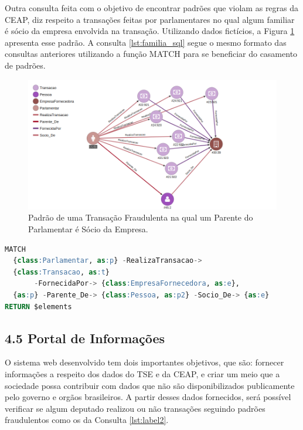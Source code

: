 \documentclass[12pt]{article}
\begin{document}
Outra consulta feita com o objetivo de encontrar padrões que violam as regras da CEAP, diz respeito a transações feitas por parlamentares no qual algum familiar é sócio da empresa envolvida na transação. Utilizando dados fictícios, a Figura \ref{fig:familia_socio} apresenta esse padrão. A consulta \ref{lst:familia_sql} segue o mesmo formato das consultas anteriores utilizando a função MATCH para se beneficiar do casamento de padrões.

\begin{figure}[ht]
\centering
\includegraphics[width=.85\textwidth]{familia_socio}
\caption{Padrão de uma Transação Fraudulenta na qual um Parente do Parlamentar é Sócio da Empresa.}
\label{fig:familia_socio}
\end{figure}

\begin{lstlisting}[label={lst:familia_sql}, caption={Consulta de Relacionamento de Uso da CEAP entre Deputados e Empresas, em que um Parente do Deputado é Sócio da Empresa.},captionpos=b, language=sql]
MATCH 
  {class:Parlamentar, as:p} -RealizaTransacao-> 
  {class:Transacao, as:t} 
       -FornecidaPor-> {class:EmpresaFornecedora, as:e},
  {as:p} -Parente_De-> {class:Pessoa, as:p2} -Socio_De-> {as:e}
RETURN $elements
\end{lstlisting}

\subsection{4.5 Portal de Informações} \label{sec:portal info}

O sistema web desenvolvido tem dois importantes objetivos, que são: fornecer informações a respeito dos dados do TSE e da CEAP, e criar um meio que a sociedade possa contribuir com dados que não são disponibilizados publicamente pelo governo e orgãos brasileiros. A partir desses dados fornecidos, será possível verificar se algum deputado realizou ou não transações seguindo padrões fraudulentos como os da Consulta \ref{lst:label2}.
\end{document}
